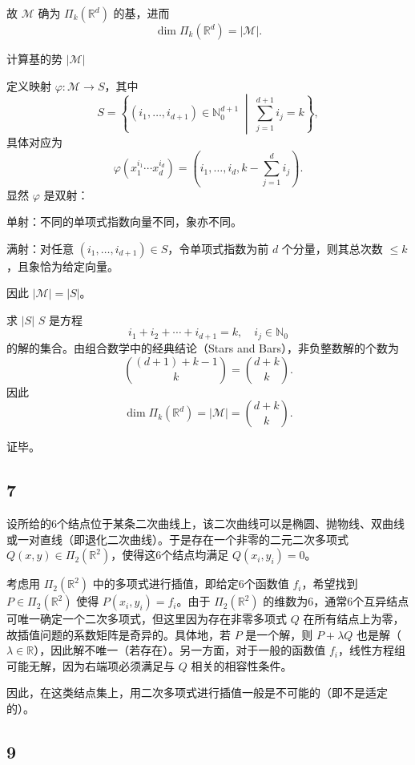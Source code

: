 \documentclass{article}
\begin{document}
故 \(\mathcal{M}\) 确为 \(\Pi_k(\mathbb{R}^d)\) 的基，进而
   \[
   \dim \Pi_k(\mathbb{R}^d) = |\mathcal{M}|.
   \]

计算基的势 \(|\mathcal{M}|\)
   
定义映射 \(\varphi : \mathcal{M} \to S\)，其中
   \[
   S = \left\{ (i_1, \dots, i_{d+1}) \in \mathbb{N}_0^{d+1} \;\middle|\; \sum_{j=1}^{d+1} i_j = k \right\},
   \]
   具体对应为
   \[
   \varphi\!\left( x_1^{i_1} \cdots x_d^{i_d} \right) = (i_1, \dots, i_d, k - \textstyle\sum_{j=1}^d i_j).
   \]
显然 \(\varphi\) 是双射：  

单射：不同的单项式指数向量不同，象亦不同。  

满射：对任意 \((i_1,\dots,i_{d+1}) \in S\)，令单项式指数为前 \(d\) 个分量，则其总次数 \(\le k\)，且象恰为给定向量。

因此 \(|\mathcal{M}| = |S|\)。

求 \(|S|\)  
   \(S\) 是方程
   \[
   i_1 + i_2 + \cdots + i_{d+1} = k, \quad i_j \in \mathbb{N}_0
   \]
   的解的集合。由组合数学中的经典结论（Stars and Bars），非负整数解的个数为
   \[
   \binom{(d+1) + k - 1}{k} = \binom{d+k}{k}.
   \]
   因此
   \[
   \dim \Pi_k(\mathbb{R}^d) = |\mathcal{M}| = \binom{d+k}{k}.
   \]

证毕。

\subsection*{7}
  
设所给的6个结点位于某条二次曲线上，该二次曲线可以是椭圆、抛物线、双曲线或一对直线（即退化二次曲线）。于是存在一个非零的二元二次多项式 \(Q(x,y) \in \Pi_2(\mathbb{R}^2)\)，使得这6个结点均满足 \(Q(x_i,y_i)=0\)。  

考虑用 \(\Pi_2(\mathbb{R}^2)\) 中的多项式进行插值，即给定6个函数值 \(f_i\)，希望找到 \(P \in \Pi_2(\mathbb{R}^2)\) 使得 \(P(x_i,y_i)=f_i\)。由于 \(\Pi_2(\mathbb{R}^2)\) 的维数为6，通常6个互异结点可唯一确定一个二次多项式，但这里因为存在非零多项式 \(Q\) 在所有结点上为零，故插值问题的系数矩阵是奇异的。具体地，若 \(P\) 是一个解，则 \(P+\lambda Q\) 也是解（\(\lambda \in \mathbb{R}\)），因此解不唯一（若存在）。另一方面，对于一般的函数值 \(f_i\)，线性方程组可能无解，因为右端项必须满足与 \(Q\) 相关的相容性条件。  

因此，在这类结点集上，用二次多项式进行插值一般是不可能的（即不是适定的）。  

\subsection*{9}
\end{document}
